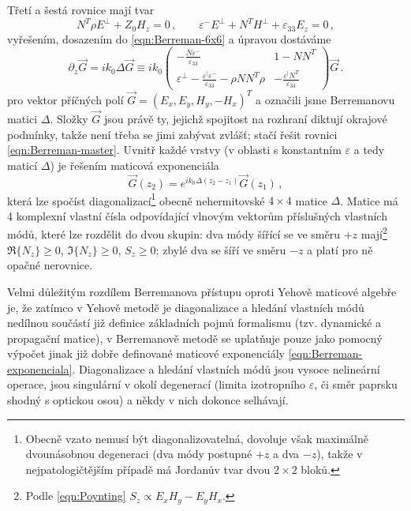 Třetí a šestá rovnice mají tvar
\begin{equation}
    N^T \rho E^\perp + Z_0 H_z =0 \,, \qquad \varepsilon^- E^\perp + N^T H^\perp + \varepsilon_{33} E_z=0 \,,
\end{equation}
vyřešením, dosazením do \eqref{eqn:Berreman-6x6} a úpravou dostáváme
\begin{equation} 
\label{eqn:Berreman-master}
    \partial_z \vec{G}
    = i k_0 \Delta \vec{G}
    \equiv i k_0 \begin{pmatrix}
        -\frac{N\varepsilon^-}{\varepsilon_{33}} & 1-NN^T \\ \varepsilon^\perp - \frac{\varepsilon^\vert\varepsilon^-}{\varepsilon_{33}} - \rho NN^T \rho & - \frac{\varepsilon^\vert N^T}{\varepsilon_{33}}
    \end{pmatrix}
    \vec{G} \,.
\end{equation}
pro vektor příčných polí $\vec{G} = (E_x, E_y, H_y, -H_x)^T$ a označili jsme Berremanovu matici $\Delta$.
Složky $\vec{G}$ jsou právě ty, jejichž spojitost na rozhraní diktují okrajové podmínky, takže není třeba se jimi zabývat zvlášť; stačí řešit rovnici \eqref{eqn:Berreman-master}.
Uvnitř každé vrstvy (v oblasti s konstantním $\varepsilon$ a tedy maticí $\Delta$) je řešením maticová exponenciála
\begin{equation}
\label{eqn:Berreman-exponenciala}
    \vec{G}(z_2) = e^{ik_0\Delta(z_2-z_1)} \vec{G}(z_1) \,,
\end{equation}
která lze spočíst diagonalizací\footnote{Obecně vzato nemusí být diagonalizovatelná, dovoluje však maximálně dvounásobnou degeneraci (dva módy postupné $+z$ a dva $-z$), takže v nejpatologičtějším případě má Jordanův tvar dvou $2\times2$ bloků.} obecně nehermitovské $4\times 4$ matice $\Delta$.
Matice má 4 komplexní vlastní čísla odpovídající vlnovým vektorům příslušných vlastních módů, které lze rozdělit do dvou skupin:
dva módy šířící se ve směru $+z$ mají\footnote{Podle \eqref{eqn:Poynting} $S_z \propto E_xH_y-E_yH_x$.} $\Re\lbrace N_z \rbrace\geq0$, $\Im\lbrace N_z \rbrace\geq0$, $S_z\geq0$; zbylé dva se šíří ve směru $-z$ a platí pro ně opačné nerovnice.

Velmi důležitým rozdílem Berremanova přístupu oproti Yehově maticové algebře je,
že zatímco v Yehově metodě je diagonalizace a hledání vlastních módů nedílnou součástí již definice základních pojmů formalismu (tzv. dynamické a propagační matice),
v Berremanově metodě se uplatňuje pouze jako pomocný výpočet jinak již dobře definované maticové exponenciály \eqref{eqn:Berreman-exponenciala}.
Diagonalizace a hledání vlastních módů jsou vysoce nelineární operace, jsou singulární v okolí degenerací (limita izotropního $\varepsilon$, či směr paprsku shodný s optickou osou) a někdy v nich dokonce selhávají\cite{xuOpticalDegeneraciesAnisotropic2000,wuSingularitiesMatrixFormalisms2018,garibelloSingularityYehTransfer2020,bertrandGeneralAnalyticalTreatment2001}.

